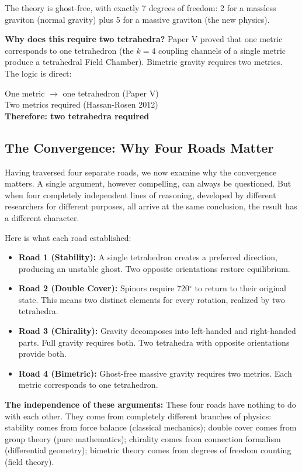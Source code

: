 \documentclass[aps,prd,preprint,superscriptaddress,showpacs,preprintnumbers,amsmath,amssymb,nofootinbib]{revtex4-2}
\begin{document}
The theory is ghost-free, with exactly 7 degrees of freedom: 2 for a massless graviton (normal gravity) plus 5 for a massive graviton (the new physics).

\textbf{Why does this require two tetrahedra?} Paper V proved that one metric corresponds to one tetrahedron (the $k=4$ coupling channels of a single metric produce a tetrahedral Field Chamber). Bimetric gravity requires two metrics. The logic is direct:

\begin{center}
One metric $\rightarrow$ one tetrahedron (Paper V)\\
Two metrics required (Hassan-Rosen 2012)\\
\textbf{Therefore: two tetrahedra required}
\end{center}

\subsection{The Convergence: Why Four Roads Matter}
\label{subsec:convergence}

Having traversed four separate roads, we now examine why the convergence matters. A single argument, however compelling, can always be questioned. But when four completely independent lines of reasoning, developed by different researchers for different purposes, all arrive at the same conclusion, the result has a different character.

Here is what each road established:
\begin{itemize}
\item \textbf{Road 1 (Stability):} A single tetrahedron creates a preferred direction, producing an unstable ghost. Two opposite orientations restore equilibrium.
\item \textbf{Road 2 (Double Cover):} Spinors require 720$^\circ$ to return to their original state. This means two distinct elements for every rotation, realized by two tetrahedra.
\item \textbf{Road 3 (Chirality):} Gravity decomposes into left-handed and right-handed parts. Full gravity requires both. Two tetrahedra with opposite orientations provide both.
\item \textbf{Road 4 (Bimetric):} Ghost-free massive gravity requires two metrics. Each metric corresponds to one tetrahedron.
\end{itemize}

\textbf{The independence of these arguments:} These four roads have nothing to do with each other. They come from completely different branches of physics: stability comes from force balance (classical mechanics); double cover comes from group theory (pure mathematics); chirality comes from connection formalism (differential geometry); bimetric theory comes from degrees of freedom counting (field theory).
\end{document}
